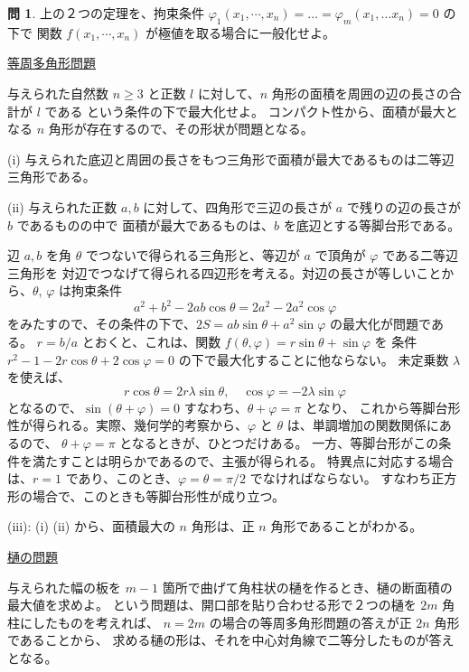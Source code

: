 \documentclass[a4paper]{jsarticle}
\theoremstyle{definition}
\newtheorem{Exercise}{問}%
\theoremstyle{remark}
\begin{document}
\begin{Exercise}
上の２つの定理を、拘束条件 $\varphi_1(x_1,\cdots,x_n) = \dots = \varphi_m(x_1, \dots x_n) = 0$ の下で
関数 $f(x_1,\cdots, x_n)$ が極値を取る場合に一般化せよ。
\end{Exercise} 

\noindent
\underline{等周多角形問題}

与えられた自然数 $n \geq 3$ と正数 $l$ に対して、$n$ 角形の面積を周囲の辺の長さの合計が $l$ である
という条件の下で最大化せよ。
コンパクト性から、面積が最大となる $n$ 角形が存在するので、その形状が問題となる。

(i) 与えられた底辺と周囲の長さをもつ三角形で面積が最大であるものは二等辺三角形である。

(ii) 与えられた正数 $a,b$ に対して、四角形で三辺の長さが $a$ で残りの辺の長さが $b$ であるものの中で
面積が最大であるものは、$b$ を底辺とする等脚台形である。

辺 $a,b$ を角 $\theta$ でつないで得られる三角形と、等辺が $a$ で頂角が $\varphi$ である二等辺三角形を
対辺でつなげて得られる四辺形を考える。対辺の長さが等しいことから、$\theta$, $\varphi$ は拘束条件
\[ 
a^2 + b^2 - 2ab\cos\theta = 2a^2 - 2a^2 \cos\varphi 
\]
をみたすので、その条件の下で、$2S = ab\sin\theta + a^2\sin\varphi$ の最大化が問題である。
$r = b/a$ とおくと、これは、関数 $f(\theta,\varphi) = r\sin\theta + \sin\varphi$ を
条件 $r^2 - 1 - 2r\cos\theta + 2\cos\varphi = 0$ の下で最大化することに他ならない。
未定乗数 $\lambda$ を使えば、
\[ 
r\cos\theta = 2r\lambda \sin\theta, 
\quad 
\cos\varphi = -2\lambda \sin \varphi 
\]
となるので、$\sin(\theta + \varphi) = 0$ すなわち、$\theta + \varphi = \pi$ となり、
これから等脚台形性が得られる。実際、幾何学的考察から、$\varphi$ と $\theta$ は、単調増加の関数関係にあるので、
$\theta + \varphi = \pi$ となるときが、ひとつだけある。
一方、等脚台形がこの条件を満たすことは明らかであるので、主張が得られる。
特異点に対応する場合は、$r=1$ であり、このとき、$\varphi = \theta = \pi/2$ でなければならない。
すなわち正方形の場合で、このときも等脚台形性が成り立つ。

(iii): (i) (ii) から、面積最大の $n$ 角形は、正 $n$ 角形であることがわかる。

\noindent
\underline{樋の問題} 

与えられた幅の板を $m-1$ 箇所で曲げて角柱状の樋を作るとき、樋の断面積の最大値を求めよ。
という問題は、開口部を貼り合わせる形で２つの樋を $2m$ 角柱にしたものを考えれば、
$n = 2m$ の場合の等周多角形問題の答えが正 $2n$ 角形であることから、
求める樋の形は、それを中心対角線で二等分したものが答えとなる。
\end{document}
